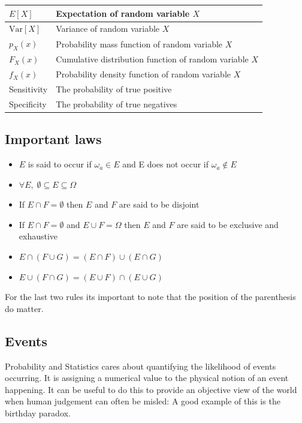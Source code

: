 \documentclass[12pt]{article}
\newcommand{\Var}[1]{\text{Var}[#1]}
\begin{document}
\begin{table}[H]
\begin{tabular}{|l|l|}
        \(E[X]\) & Expectation of random variable \(X\) \\ \hline
        \(\Var{X}\) & Variance of random variable \(X\) \\ \hline
        \(p_X(x)\) & Probability mass function of random variable \(X\) \\ \hline
        \(F_X(x)\) & Cumulative distribution function of random variable \(X\) \\ \hline
        \(f_X(x)\) & Probability density function of random variable \(X\) \\ \hline
        Sensitivity & The probability of true positive \\ \hline
        Specificity & The probability of true negatives \\ \hline
    \end{tabular}
\end{table}
\subsection*{Important laws}
\begin{itemize}
    \item \(E\) is said to occur if \(\omega_a\in E\) and E does not occur if \(\omega_a\notin E\)
    \item \(\forall E,\;\emptyset\subseteq E\subseteq \Omega\)
    \item If \(E\cap F=\emptyset\) then \(E\) and \(F\) are said to be disjoint
    \item If \(E\cap F=\emptyset\) and \(E\cup F=\Omega\) then \(E\) and \(F\) are said to be exclusive and exhaustive
    \item \(E\cap(F\cup G)=(E\cap F)\cup(E\cap G)\)
    \item \(E\cup(F\cap G)=(E\cup F)\cap(E\cup G)\)
\end{itemize}
For the last two rules its important to note that the position of the parenthesis do matter.
\subsection*{Events}
Probability and Statistics cares about quantifying the likelihood of events occurring. It is assigning a numerical value to the physical notion of an event happening. It can be useful to do this to provide an objective view of the world when human judgement can often be misled: A good example of this is the birthday paradox.
\end{document}
